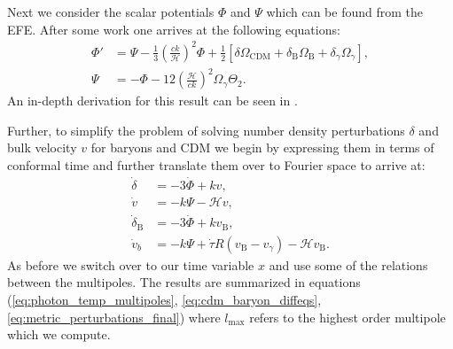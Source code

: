 \documentclass[%
reprint,
 amsmath,amssymb,
 aps,
]{revtex4-2}
\newcommand{\Hp}{\mathcal{H}}
\begin{document}
Next we consider the scalar potentials $\Phi$ and $\Psi$ which can be found from the EFE. After some work one arrives at the following equations:
\begin{align*}
	\Phi'&=\Psi-\frac{1}{3}\left(\frac{ck}{\Hp}\right)^2\Phi+\frac{1}{2}\left[\delta\Omega_\text{CDM}+\delta_\text{B}\Omega_\text{B}+\delta_\gamma\Omega_\gamma\right],\\
	\Psi&=-\Phi-12\left(\frac{\Hp}{ck}\right)^2\Omega_\gamma\Theta_2.
\end{align*}
An in-depth derivation for this result can be seen in \cite{Dodelson:2003ft}.

Further, to simplify the problem of solving number density perturbations $\delta$ and bulk velocity $v$ for baryons and CDM we begin by expressing them in terms of conformal time and further translate them over to Fourier space to arrive at:
\begin{align*}
	\dot\delta&=-3\dot\Phi+kv,\\
	\dot v&=-k\Psi-\Hp v,\\
	\dot\delta_\text{B}&=-3\dot\Phi+kv_\text{B},\\
	\dot v_b&=-k\Psi+\dot\tau R(v_\text{B}-v_\gamma)-\Hp v_\text{B}.
\end{align*} 
As before we switch over to our time variable $x$ and use some of the relations between the multipoles. The results are summarized in equations (\ref{eq:photon_temp_multipoles}, \ref{eq:cdm_baryon_diffeqs}, \ref{eq:metric_perturbations_final}) where $l_\text{max}$ refers to the highest order multipole which we compute. 
\end{document}
